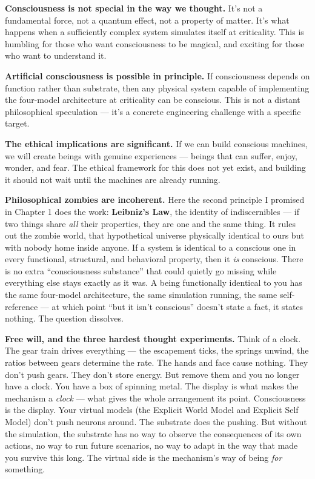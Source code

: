 \documentclass[11pt, twoside, openright]{book}
\begin{document}
\textbf{Consciousness is not special in the way we thought.} It's not a fundamental force, not a quantum effect, not a property of matter. It's what happens when a sufficiently complex system simulates itself at criticality. This is humbling for those who want consciousness to be magical, and exciting for those who want to understand it.

\textbf{Artificial consciousness is possible in principle.} If consciousness depends on function rather than substrate, then any physical system capable of implementing the four-model architecture at criticality can be conscious. This is not a distant philosophical speculation --- it's a concrete engineering challenge with a specific target.

\textbf{The ethical implications are significant.} If we can build conscious machines, we will create beings with genuine experiences --- beings that can suffer, enjoy, wonder, and fear. The ethical framework for this does not yet exist, and building it should not wait until the machines are already running.

\textbf{Philosophical zombies are incoherent.} Here the second principle I promised in Chapter 1 does the work: \textbf{Leibniz's Law}, the identity of indiscernibles --- if two things share \textit{all} their properties, they are one and the same thing. It rules out the zombie world, that hypothetical universe physically identical to ours but with nobody home inside anyone. If a system is identical to a conscious one in every functional, structural, and behavioral property, then it \textit{is} conscious. There is no extra ``consciousness substance'' that could quietly go missing while everything else stays exactly as it was. A being functionally identical to you has the same four-model architecture, the same simulation running, the same self-reference --- at which point ``but it isn't conscious'' doesn't state a fact, it states nothing. The question dissolves.

\textbf{Free will, and the three hardest thought experiments.} Think of a clock. The gear train drives everything --- the escapement ticks, the springs unwind, the ratios between gears determine the rate. The hands and face cause nothing. They don't push gears. They don't store energy. But remove them and you no longer have a clock. You have a box of spinning metal. The display is what makes the mechanism a \textit{clock} --- what gives the whole arrangement its point. Consciousness is the display. Your virtual models (the Explicit World Model and Explicit Self Model) don't push neurons around. The substrate does the pushing. But without the simulation, the substrate has no way to observe the consequences of its own actions, no way to run future scenarios, no way to adapt in the way that made you survive this long. The virtual side is the mechanism's way of being \textit{for} something.
\end{document}

